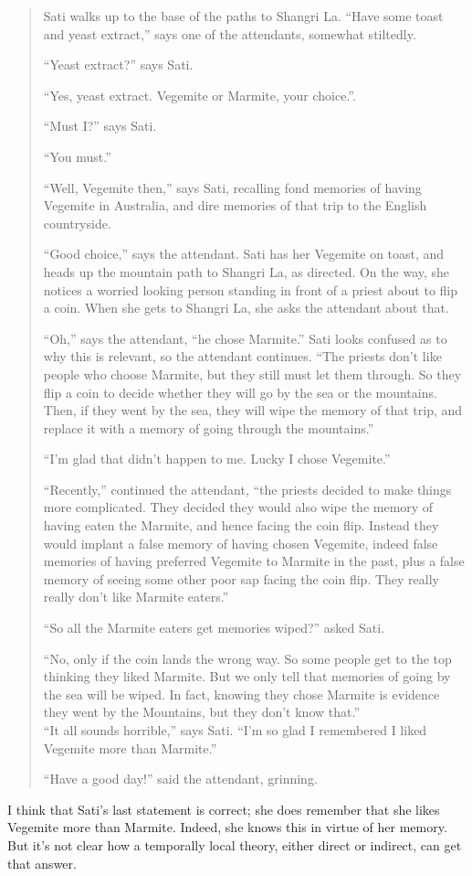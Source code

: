\begin{quote}

Sati walks up to the base of the paths to Shangri La. ``Have some toast and yeast extract,'' says one of the attendants, somewhat stiltedly. 

``Yeast extract?'' says Sati. 

``Yes, yeast extract. Vegemite or Marmite, your choice.''. 

``Must I?'' says Sati. 

``You must.'' 

``Well, Vegemite then,'' says Sati, recalling fond memories of having Vegemite in Australia, and dire memories of that trip to the English countryside. 

``Good choice,'' says the attendant. Sati has her Vegemite on toast, and heads up the mountain path to Shangri La, as directed. On the way, she notices a worried looking person standing in front of a priest about to flip a coin. When she gets to Shangri La, she asks the attendant about that.

``Oh,'' says the attendant, ``he chose Marmite.'' Sati looks confused as to why this is relevant, so the attendant continues. ``The priests don't like people who choose Marmite, but they still must let them through. So they flip a coin to decide whether they will go by the sea or the mountains. Then, if they went by the sea, they will wipe the memory of that trip, and replace it with a memory of going through the mountains.''

``I'm glad that didn't happen to me. Lucky I chose Vegemite.''

``Recently,'' continued the attendant, ``the priests decided to make things more complicated. They decided they would also wipe the memory of having eaten the Marmite, and hence facing the coin flip. Instead they would implant a false memory of having chosen Vegemite, indeed false memories of having preferred Vegemite to Marmite in the past, plus a false memory of seeing some other poor sap facing the coin flip. They really really don't like Marmite eaters.''

``So all the Marmite eaters get memories wiped?'' asked Sati. 

``No, only if the coin lands the wrong way. So some people get to the top thinking they liked Marmite. But we only tell that memories of going by the sea will be wiped. In fact, knowing they chose Marmite is evidence they went by the Mountains, but they don't know that.''\\
``It all sounds horrible,'' says Sati. ``I'm so glad I remembered I liked Vegemite more than Marmite.''

``Have a good day!'' said the attendant, grinning.
\end{quote}
I think that Sati's last statement is correct; she does remember that she likes Vegemite more than Marmite. Indeed, she knows this in virtue of her memory. But it's not clear how a temporally local theory, either direct or indirect, can get that answer.

